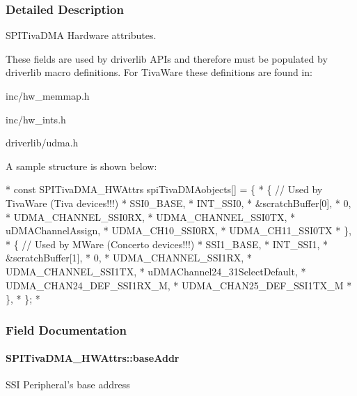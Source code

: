 \subsubsection{Detailed Description}
S\-P\-I\-Tiva\-D\-M\-A Hardware attributes. 

These fields are used by driverlib A\-P\-Is and therefore must be populated by driverlib macro definitions. For Tiva\-Ware these definitions are found in\-:
\begin{DoxyItemize}
\item inc/hw\-\_\-memmap.\-h
\item inc/hw\-\_\-ints.\-h
\item driverlib/udma.\-h
\end{DoxyItemize}

A sample structure is shown below\-: 
\begin{DoxyCode}
*  \textcolor{keyword}{const} SPITivaDMA_HWAttrs spiTivaDMAobjects[] = \{
*      \{   \textcolor{comment}{// Used by TivaWare (Tiva devices!!!)}
*          SSI0\_BASE,
*          INT\_SSI0,
*          &scratchBuffer[0],
*          0,
*          UDMA\_CHANNEL\_SSI0RX,
*          UDMA\_CHANNEL\_SSI0TX,
*          uDMAChannelAssign,
*          UDMA\_CH10\_SSI0RX,
*          UDMA\_CH11\_SSI0TX
*      \},
*      \{   \textcolor{comment}{// Used by MWare (Concerto devices!!!)}
*          SSI1\_BASE,
*          INT\_SSI1,
*          &scratchBuffer[1],
*          0,
*          UDMA\_CHANNEL\_SSI1RX,
*          UDMA\_CHANNEL\_SSI1TX,
*          uDMAChannel24\_31SelectDefault,
*          UDMA\_CHAN24\_DEF\_SSI1RX\_M,
*          UDMA\_CHAN25\_DEF\_SSI1TX\_M
*      \},
*  \};
*  
\end{DoxyCode}
 

\subsubsection{Field Documentation}
\paragraph[{base\-Addr}]{ S\-P\-I\-Tiva\-D\-M\-A\-\_\-\-H\-W\-Attrs\-::base\-Addr}\label{struct_s_p_i_tiva_d_m_a___h_w_attrs_a3264130b8293c92d7556f4288da9e6c3}
S\-S\-I Peripheral's base address 
